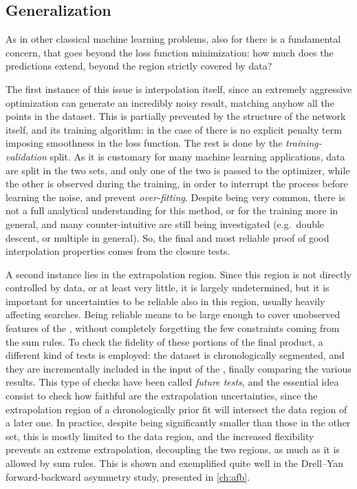 \subsection{Generalization}

As in other classical machine learning problems, also for \pdfs there is a
fundamental concern, that goes beyond the loss function minimization: how much
does the predictions extend, beyond the region strictly covered by data?

The first instance of this issue is interpolation itself, since an extremely
aggressive optimization can generate an incredibly noisy result, matching
anyhow all the points in the dataset.
%
This is partially prevented by the structure of the network itself, and its
training algorithm: in the case of \nnpdf there is no explicit penalty term
imposing smoothness in the loss function.
%
The rest is done by the \textit{training-validation} split. As it is customary
for many machine learning applications, data are split in the two sets, and
only one of the two is passed to the optimizer, while the other is observed
during the training, in order to interrupt the process before learning the
noise, and prevent \textit{over-fitting}.
%
Despite being very common, there is not a full analytical understanding for
this method, or for the \nn training more in general, and many
counter-intuitive are still being investigated (e.g.\ double descent, or
multiple in general).
So, the final and most reliable proof of good interpolation properties comes
from the closure tests.

A second instance lies in the extrapolation region. 
%
Since this region is not directly controlled by data, or at least very little,
it is largely undetermined, but it is important for \pdfs uncertainties to be
reliable also in this region, usually heavily affecting \bsm searches.
%
Being reliable means to be large enough to cover unobserved features of the
\pdfs, without completely forgetting the few constraints coming from the sum
rules.
%
To check the fidelity of these portions of the final product, a different kind
of tests is employed: the dataset is chronologically segmented, and they are
incrementally included in the input of the \nn, finally comparing the various
results.
%
This type of checks have been called \textit{future tests}, and the essential
idea consist to check how faithful are the extrapolation uncertainties, since
the extrapolation region of a chronologically prior fit will intersect the data
region of a later one.
%
In practice, despite  being significantly smaller than those in the
other \pdf set, this is mostly limited to the data region, and the increased
flexibility prevents an extreme extrapolation, decoupling the two regions, as
much as it is allowed by sum rules.
This is shown and exemplified quite well in the Drell--Yan forward-backward
asymmetry study, presented in \cref{ch:afb}.

